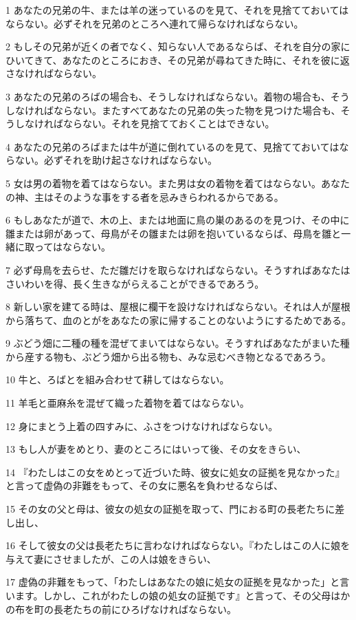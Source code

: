 \par 1 あなたの兄弟の牛、または羊の迷っているのを見て、それを見捨てておいてはならない。必ずそれを兄弟のところへ連れて帰らなければならない。
\par 2 もしその兄弟が近くの者でなく、知らない人であるならば、それを自分の家にひいてきて、あなたのところにおき、その兄弟が尋ねてきた時に、それを彼に返さなければならない。
\par 3 あなたの兄弟のろばの場合も、そうしなければならない。着物の場合も、そうしなければならない。またすべてあなたの兄弟の失った物を見つけた場合も、そうしなければならない。それを見捨てておくことはできない。
\par 4 あなたの兄弟のろばまたは牛が道に倒れているのを見て、見捨てておいてはならない。必ずそれを助け起さなければならない。
\par 5 女は男の着物を着てはならない。また男は女の着物を着てはならない。あなたの神、主はそのような事をする者を忌みきらわれるからである。
\par 6 もしあなたが道で、木の上、または地面に鳥の巣のあるのを見つけ、その中に雛または卵があって、母鳥がその雛または卵を抱いているならば、母鳥を雛と一緒に取ってはならない。
\par 7 必ず母鳥を去らせ、ただ雛だけを取らなければならない。そうすればあなたはさいわいを得、長く生きながらえることができるであろう。
\par 8 新しい家を建てる時は、屋根に欄干を設けなければならない。それは人が屋根から落ちて、血のとがをあなたの家に帰することのないようにするためである。
\par 9 ぶどう畑に二種の種を混ぜてまいてはならない。そうすればあなたがまいた種から産する物も、ぶどう畑から出る物も、みな忌むべき物となるであろう。
\par 10 牛と、ろばとを組み合わせて耕してはならない。
\par 11 羊毛と亜麻糸を混ぜて織った着物を着てはならない。
\par 12 身にまとう上着の四すみに、ふさをつけなければならない。
\par 13 もし人が妻をめとり、妻のところにはいって後、その女をきらい、
\par 14 『わたしはこの女をめとって近づいた時、彼女に処女の証拠を見なかった』と言って虚偽の非難をもって、その女に悪名を負わせるならば、
\par 15 その女の父と母は、彼女の処女の証拠を取って、門におる町の長老たちに差し出し、
\par 16 そして彼女の父は長老たちに言わなければならない。『わたしはこの人に娘を与えて妻にさせましたが、この人は娘をきらい、
\par 17 虚偽の非難をもって、「わたしはあなたの娘に処女の証拠を見なかった」と言います。しかし、これがわたしの娘の処女の証拠です』と言って、その父母はかの布を町の長老たちの前にひろげなければならない。
